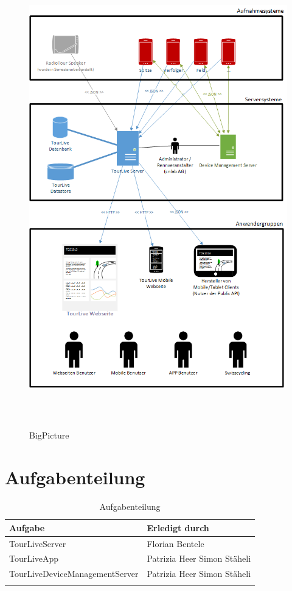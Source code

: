 \begin{figure}[H]
	\caption{BigPicture}
	\centering
	\includegraphics[height=200mm]{images/BigPicture.png}
\end{figure}

\pagebreak

\section{Aufgabenteilung}

{\renewcommand{\arraystretch}{2}%
    \begin{longtable}{  p{9.0cm} | p{3.0cm} }

    \textbf{Aufgabe} & \textbf{Erledigt durch} \\ 
  	\hline
	\hline
    TourLiveServer & Florian Bentele \\
    \hline
    TourLiveApp & Patrizia Heer Simon Stäheli \\
    \hline
    TourLiveDeviceManagementServer & Patrizia Heer Simon Stäheli \\
    \hline

\caption{Aufgabenteilung}
\end{longtable}}
